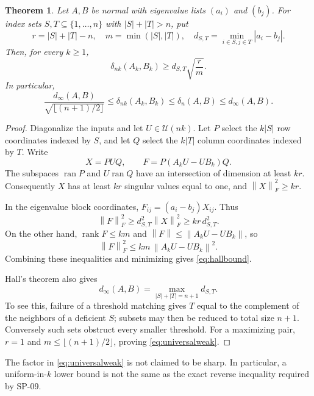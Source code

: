 \documentclass[11pt]{article}
\newtheorem{theorem}{Theorem}[section]
\theoremstyle{definition}\newtheorem{definition}[theorem]{Definition}
\theoremstyle{remark}\newtheorem{remark}[theorem]{Remark}
\newcommand{\U}{\mathcal U}
\newcommand{\rank}{\operatorname{rank}}
\newcommand{\norm}[1]{\left\lVert#1\right\rVert}
\newcommand{\dd}{\delta}
\newcommand{\dm}{d_\infty}
\begin{document}
\begin{theorem}\label{thm:hallbound}
Let $A,B$ be normal with eigenvalue lists $(a_i)$ and $(b_j)$. For index sets $S,T\subseteq\{1,\ldots,n\}$ with $|S|+|T|>n$, put
\[
 r=|S|+|T|-n,\quad m=\min(|S|,|T|),\quad d_{S,T}=\min_{i\in S,j\in T}|a_i-b_j|.
\]
Then, for every $k\ge1$,
\begin{equation}\label{eq:hallbound}
 \dd_{nk}(A_k,B_k)\ge d_{S,T}\sqrt{\frac r m}.
\end{equation}
In particular,
\begin{equation}\label{eq:universalweak}
 \frac{\dm(A,B)}{\sqrt{\lfloor(n+1)/2\rfloor}}
 \le\dd_{nk}(A_k,B_k)\le\dd_n(A,B)\le\dm(A,B).
\end{equation}
\end{theorem}
\begin{proof}
Diagonalize the inputs and let $U\in\U(nk)$. Let $P$ select the $k|S|$ row coordinates indexed by $S$, and let $Q$ select the $k|T|$ column coordinates indexed by $T$. Write
\[
 X=PUQ,\qquad F=P(A_kU-UB_k)Q.
\]
The subspaces $\operatorname{ran}P$ and $U\operatorname{ran}Q$ have an intersection of dimension at least $kr$. Consequently $X$ has at least $kr$ singular values equal to one, and $\norm X_F^2\ge kr$.

In the eigenvalue block coordinates, $F_{ij}=(a_i-b_j)X_{ij}$. Thus
\[
 \norm F_F^2\ge d_{S,T}^2\norm X_F^2\ge kr\,d_{S,T}^2.
\]
On the other hand, $\rank F\le km$ and $\norm F\le\norm{A_kU-UB_k}$, so
\[
 \norm F_F^2\le km\,\norm{A_kU-UB_k}^2.
\]
Combining these inequalities and minimizing gives \eqref{eq:hallbound}.

Hall's theorem also gives
\[
 \dm(A,B)=\max_{|S|+|T|=n+1}d_{S,T}.
\]
To see this, failure of a threshold matching gives $T$ equal to the complement of the neighbors of a deficient $S$; subsets may then be reduced to total size $n+1$. Conversely such sets obstruct every smaller threshold. For a maximizing pair, $r=1$ and $m\le\lfloor(n+1)/2\rfloor$, proving \eqref{eq:universalweak}.
\end{proof}

The factor in \eqref{eq:universalweak} is not claimed to be sharp. In particular, a uniform-in-$k$ lower bound is not the same as the exact reverse inequality required by SP-09.
\end{document}
